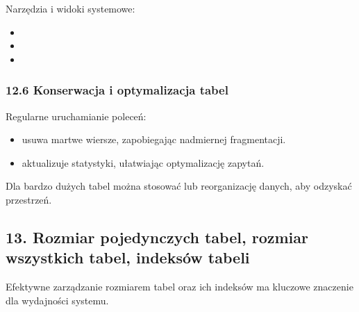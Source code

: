 \documentclass[letterpaper,10pt,polish]{sphinxmanual}
\begin{document}
\sphinxAtStartPar
Narzędzia i widoki systemowe:
\begin{itemize}
\item {} 
\sphinxAtStartPar
{}

\item {} 
\sphinxAtStartPar
{}

\item {} 
\sphinxAtStartPar
{}

\end{itemize}


\subsubsection{12.6 Konserwacja i optymalizacja tabel}
\label{\detokenize{rozdzial2/Konfiguracja_baz_danych/Konfiguracja_baz_danych:konserwacja-i-optymalizacja-tabel}}
\sphinxAtStartPar
Regularne uruchamianie poleceń:
\begin{itemize}
\item {} 
\sphinxAtStartPar
{} \textendash{} usuwa martwe wiersze, zapobiegając nadmiernej fragmentacji.

\item {} 
\sphinxAtStartPar
{} \textendash{} aktualizuje statystyki, ułatwiając optymalizację zapytań.

\end{itemize}

\sphinxAtStartPar
Dla bardzo dużych tabel można stosować  lub reorganizację danych, aby odzyskać przestrzeń.


\subsection{13. Rozmiar pojedynczych tabel, rozmiar wszystkich tabel, indeksów tabeli}
\label{\detokenize{rozdzial2/Konfiguracja_baz_danych/Konfiguracja_baz_danych:rozmiar-pojedynczych-tabel-rozmiar-wszystkich-tabel-indeksow-tabeli}}
\sphinxAtStartPar
Efektywne zarządzanie rozmiarem tabel oraz ich indeksów ma kluczowe znaczenie dla wydajności systemu.
\end{document}
